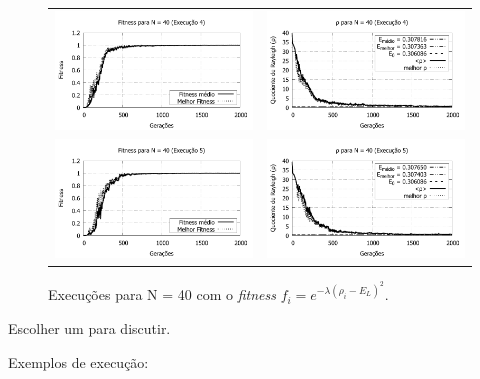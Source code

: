 \begin{figure}[phtb]
\begin{tabular}{@{}cc@{}}
		\includegraphics[width=.40\textwidth]{figs/resultados/fitnessEL/N-40_E-4_fitness-extendido.pdf} &
    \includegraphics[width=.40\textwidth]{figs/resultados/fitnessEL/N-40_E-4_rho_extendido.pdf}		\\
		\includegraphics[width=.40\textwidth]{figs/resultados/fitnessEL/N-40_E-5_fitness-extendido.pdf} &
    \includegraphics[width=.40\textwidth]{figs/resultados/fitnessEL/N-40_E-5_rho_extendido.pdf}
  \end{tabular}
  \caption{Execuções para N = 40 com o \textit{fitness} $f_i = e^{-\lambda(\rho_i - E_L)^2}$.}
	\label{fig:execucoes_N40_EL}
	\end{figure}
	
	Escolher um para discutir.
	
	Exemplos de execução:
	
